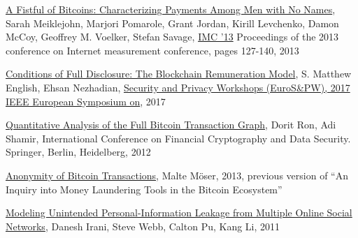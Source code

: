 \begin{thebibliography}{1}
\href{https://cseweb.ucsd.edu/~smeiklejohn/files/imc13.pdf}{A Fistful of
Bitcoins: Characterizing Payments Among Men with No Names}, Sarah Meiklejohn,
Marjori Pomarole, Grant Jordan, Kirill Levchenko, Damon McCoy, Geoffrey M.
Voelker, Stefan Savage, 
\href{http://www.sigcomm.org/events/imc-conference/}{IMC '13} Proceedings of
the 2013 conference on Internet measurement conference, pages 127-140, 2013

\href{http://ieeexplore.ieee.org/document/7966972/}{Conditions of Full
Disclosure: The Blockchain Remuneration Model}, S. Matthew English, 
Ehsan Nezhadian,
\href{http://ieeexplore.ieee.org/xpl/mostRecentIssue.jsp?punumber=7966454}
{Security and Privacy Workshops (EuroS\&PW), 2017 IEEE European Symposium on},
2017

\href{http://arimoto.lolipop.jp/584.pdf}{Quantitative Analysis of the Full
Bitcoin Transaction Graph}, Dorit Ron, Adi Shamir, International Conference on
Financial Cryptography and Data Security. Springer, Berlin, Heidelberg, 2012

\bibitem{}
\href{https://www.wi.uni-muenster.de/sites/wi/files/public/department/itsecurity/mbc13/mbc13-moeser-paper.pdf}
{Anonymity of Bitcoin Transactions}, Malte Möser, 2013, previous version of
``An Inquiry into Money Laundering Tools in the Bitcoin Ecosystem''

\href{https://www.cc.gatech.edu/projects/doi/Papers/DIrani_InternetComp_2011.pdf
}{Modeling Unintended Personal-Information Leakage from Multiple Online Social
Networks}, Danesh Irani, Steve Webb, Calton Pu, Kang Li, 2011
\end{thebibliography}


